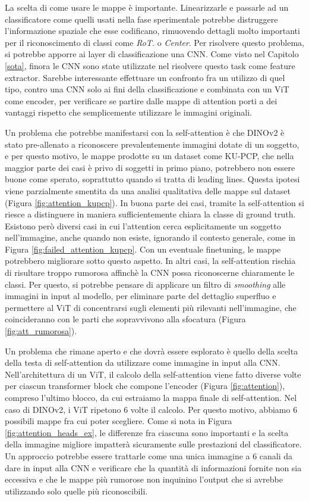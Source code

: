 La scelta di come usare le mappe è importante. Linearizzarle e passarle ad un classificatore come quelli usati nella fase sperimentale potrebbe distruggere l'informazione spaziale che esse codificano, rimuovendo dettagli molto importanti per il riconoscimento di classi come \textit{RoT.} o \textit{Center}. Per risolvere questo problema, si potrebbe apporre ai layer di classificazione una CNN. Come visto nel Capitolo \ref{sota}, finora le CNN sono state utilizzate nel risolvere questo task come feature extractor. Sarebbe interessante effettuare un confronto fra un utilizzo di quel tipo, contro una CNN solo ai fini della classificazione e combinata con un ViT come encoder, per verificare se partire dalle mappe di attention porti a dei vantaggi rispetto che semplicemente utilizzare le immagini originali.

Un problema che potrebbe manifestarsi con la self-attention è che DINOv2 è stato pre-allenato a riconoscere prevalentemente immagini dotate di un soggetto, e per questo motivo, le mappe prodotte su un dataset come KU-PCP, che nella maggior parte dei casi è privo di soggetti in primo piano, potrebbero non essere buone come sperato, soprattutto quando si tratta di leading lines. Questa ipotesi viene parzialmente smentita da una analisi qualitativa delle mappe sul dataset (Figura \ref{fig:attention_kupcp}). In buona parte dei casi, tramite la self-attention si riesce a distinguere in maniera sufficientemente chiara la classe di ground truth. Esistono però diversi casi in cui l'attention cerca esplicitamente un soggetto nell'immagine, anche quando non esiste, ignorando il contesto generale, come in Figura \ref{fig:failed_attention_kupcp}. Con un eventuale finetuning, le mappe potrebbero migliorare sotto questo aspetto. In altri casi, la self-attention rischia di risultare troppo rumorosa affinchè la CNN possa riconoscerne chiaramente le classi. Per questo, si potrebbe pensare di applicare un filtro di \textit{smoothing} alle immagini in input al modello, per eliminare parte del dettaglio superfluo e permettere al ViT di concentrarsi sugli elementi più rilevanti nell'immagine, che coincideranno con le parti che sopravvivono alla sfocatura (Figura \ref{fig:att_rumorosa}).


Un problema che rimane aperto e che dovrà essere esplorato è quello della scelta della testa di self-attention da utilizzare come immagine in input alla CNN. Nell'architettura di un ViT, il calcolo della self-attention viene fatto diverse volte per ciascun transformer block che compone l'encoder (Figura \ref{fig:attention}), compreso l'ultimo blocco, da cui estraiamo la mappa finale di self-attention. Nel caso di DINOv2, i ViT ripetono 6 volte il calcolo. Per questo motivo, abbiamo 6 possibili mappe fra cui poter scegliere. Come si nota in Figura \ref{fig:attention_heads_ex}, le differenze fra ciascuna sono importanti e la scelta della immagine migliore impatterà sicuramente sulle prestazioni del classificatore. Un approccio potrebbe essere trattarle come una unica immagine a 6 canali da dare in input alla CNN e verificare che la quantità di informazioni fornite non sia eccessiva e che le mappe più rumorose non inquinino l'output che si avrebbe utilizzando solo quelle più riconoscibili.

